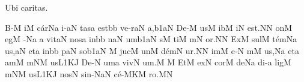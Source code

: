 

\beginhymn Ubi caritas.

\Internote
\nosolesmescustos
\initiumgregorianum
{}%
\sgn {}B-\punctum M\egn
\sgn {}i{}\punctum M\egn
\spatium
\sgn c{\'a}r\pes Na\egn
\sgn {}i-\clivis aN\egn
\sgn tas\punctum a\egn
\spatium
\sgn {}e{st}\bmolle b\punctum b\egn
\spatium
\sgn ve{-r}\clivis aN\egn
\sgn {}a{,}\episem b1\clivis aN\egn
\spatium
\divisiominima
\spatium
\sgn D{e}-\punctum M\egn
\sgn {}us\punctum M\egn
\spatium
\sgn {}ib\punctum M\egn
\sgn {}i{}\punctum N\egn
\spatium
\sgn {}e{st.}\punctum N\augmentum N\egn
\spatium
\divisiofinalis
\spatium
{}on\punctum M\egn
{}eg\punctum M\egn
{}-\pes Na\egn
\custos a
\lineaproxima
\sgn vit\clivis aN\egn
\spatium
\sgn nos\punctum a\egn
\spatium
\sgn {}in\bmolle b\punctum b\egn
\spatium
{}n\clivis aN\egn
\sgn {}um\episem b1\clivis aN\egn
\spatium
\divisiominima
\spatium
{}s\punctum M\egn
\sgn ti{}\punctum M\egn
\spatium
{}m\punctum N\egn
\sgn {}o{r.}\punctum N\augmentum N\egn
\spatium
\divisiofinalis
\spatium
{}Ex\punctum M\egn
\sgn sul\punctum M\egn
\sgn t{\'e}m\pes Na\egn
\sgn {}u{s,}\clivis aN\egn
\spatium
\sgn {}et\punctum a\egn
\spatium
\sgn {}in\bmolle b\punctum b\egn
\spatium
{}p\clivis aN\egn
\sgn so{}\episem b1\clivis aN\egn
\spatium
\divisiominima
\spatium
\custos M
\lineaproxima
\sgn juc\punctum M\egn
\sgn {}un\punctum M\egn
\sgn d{\'e}m\punctum N\egn
\sgn {}u{r.}\punctum N\augmentum N\egn
\spatium
\divisiofinalis
\spatium
{}im\punctum M\egn
\sgn {}e-\punctum N\egn
{}m\punctum M\egn
\sgn {}u{s,}\pes Na\egn
\spatium
\sgn {}et\punctum a\egn
\spatium
\sgn {}am\punctum M\egn
{}m\clivis NM\egn
\sgn {}us\episem L1\clivis KJ\egn
\spatium
\sgn De-\punctum N\egn
\sgn {}um\punctum a\egn
\spatium
\sgn v{i}v\punctum N\egn
\sgn {}u{m.}\punctum M\egn
\spatium
\divisiofinalis
\spatium
\custos M
\lineaproxima
{}Et\punctum M\egn
\spatium
\sgn {}ex\punctum N\egn
\spatium
\sgn c{o}r\punctum M\egn
\sgn de{}\pes Na\egn
\spatium
\sgn di-\punctum a\egn
\sgn lig\punctum M\egn
{}m\clivis NM\egn
\sgn {}us\episem L1\clivis KJ\egn
\spatium
\sgn nos\punctum N\egn
\spatium
\sgn si{n-}\torculus NaN\egn
\sgn c{\'e}-\porrectus MKM\egn
\sgn ro.\punctum M\augmentum N\egn
\spatium
\Finisgregoriana

